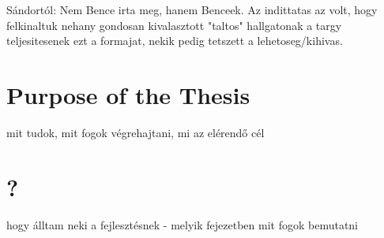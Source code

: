 Sándortól: Nem Bence irta meg, hanem Benceek. Az indittatas az volt, hogy felkinaltuk nehany gondosan kivalasztott "taltos" hallgatonak a targy teljesitesenek ezt a formajat, nekik pedig tetszett a lehetoseg/kihivas.

\section{Purpose of the Thesis}
mit tudok, mit fogok végrehajtani, mi az elérendő cél

\section{?}
hogy álltam neki a fejlesztésnek - melyik fejezetben mit fogok bemutatni